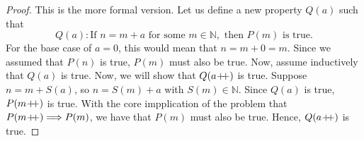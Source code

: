 \begin{proof}
    This is the more formal version. Let us define a new property $Q(a)$ such that
    $$Q(a) : \text{If } n = m + a \text{ for some } m \in \mathbb{N}, \text{ then } P(m) \text{ is true.}$$
    For the base case of $a = 0$, this would mean that $n = m + 0 = m.$ 
    Since we assumed that $P(n)$ is true, $P(m)$ must also be true.
    Now, assume inductively that $Q(a)$ is true. 
    Now, we will show that $Q(a \! +\!\!\!+)$ is true. 
    Suppose $n = m + S(a)$, so $n = S(m) + a$ with $S(m) \in \mathbb{N}$. 
    Since $Q(a)$ is true, $P(m \! +\!\!\!+)$ is true.
    With the core impplication of the problem that $P(m \! +\!\!\!+) \Longrightarrow P(m)$, we have that $P(m)$ must also be true.
    Hence, $Q(a \! +\!\!\!+)$ is true.
\end{proof}
